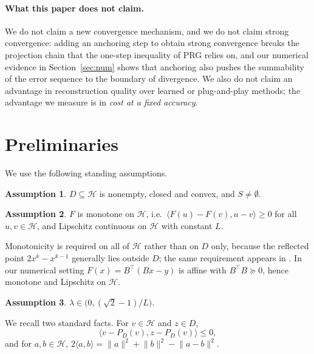 \documentclass[11pt]{article}
\theoremstyle{plain}
\theoremstyle{definition}
\newtheorem{assumption}{Assumption}
\theoremstyle{remark}
\newcommand{\HH}{\mathcal{H}}
\newcommand{\inner}[2]{\langle #1, #2 \rangle}
\newcommand{\norm}[1]{\lVert #1 \rVert}
\newcommand{\proj}[1]{P_{#1}}
\begin{document}
\paragraph{What this paper does not claim.}
We do not claim a new convergence mechanism, and we do not claim strong
convergence: adding an anchoring step to obtain strong convergence breaks the
projection chain that the one-step inequality of PRG relies on, and our numerical
evidence in Section~\ref{sec:num} shows that anchoring also pushes the
summability of the error sequence to the boundary of divergence. We also do not
claim an advantage in reconstruction quality over learned or plug-and-play
methods; the advantage we measure is in \emph{cost at a fixed accuracy}.

\section{Preliminaries}
\label{sec:prelim}

We use the following standing assumptions.

\begin{assumption}
\label{as:D}
$D \subseteq \HH$ is nonempty, closed and convex, and $S \neq \emptyset$.
\end{assumption}

\begin{assumption}
\label{as:F}
$F$ is monotone on $\HH$, i.e.\ $\inner{F(u)-F(v)}{u-v}\ge 0$ for all $u,v \in
\HH$, and Lipschitz continuous on $\HH$ with constant $L$.
\end{assumption}

Monotonicity is required on all of $\HH$ rather than on $D$ only, because the
reflected point $2x^k - x^{k-1}$ generally lies outside $D$; the same
requirement appears in \cite{Malitsky2015}. In our numerical setting
$F(x) = B^{\!\top}(Bx-y)$ is affine with $B^{\!\top}B \succeq 0$, hence
monotone and Lipschitz on $\HH$.

\begin{assumption}
\label{as:step}
$\lambda \in \bigl(0, (\sqrt{2}-1)/L\bigr)$.
\end{assumption}

We recall two standard facts. For $v \in \HH$ and $z \in D$,
\begin{equation}
\label{eq:projchar}
\inner{v - \proj{D}(v)}{z - \proj{D}(v)} \le 0 ,
\end{equation}
and for $a,b \in \HH$, $2\inner{a}{b} = \norm{a}^2 + \norm{b}^2 -
\norm{a-b}^2$.
\end{document}
